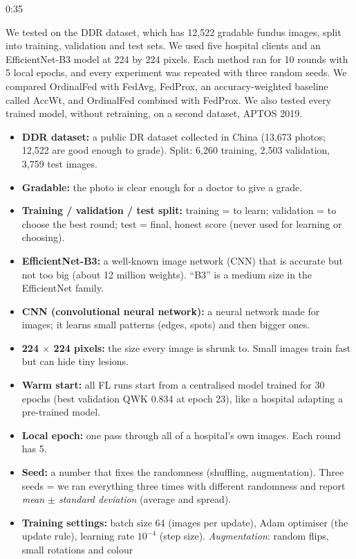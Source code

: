 \documentclass[11pt,a4paper]{article}
\newcommand{\slide}[3]{%
  \par\needspace{7\baselineskip}\bigskip\noindent{\color{accent}\large\bfseries Slide #1 \textperiodcentered\ #2}%
  \hfill{\color{muted}\small #3}\par\smallskip}
\newenvironment{terms}{%
  \par\smallskip\noindent{\color{accent}\small\bfseries TERMS ON THIS SLIDE}\par
  \begin{itemize}[leftmargin=1.2em,itemsep=2pt,topsep=2pt,label={\color{accent}\textbullet}]\small}%
  {\end{itemize}}
\newcommand{\term}[1]{\textbf{#1:}}
\begin{document}
\slide{9}{Experimental setup}{0:35}
We tested on the DDR dataset, which has 12,522 gradable fundus images, split into training,
validation and test sets. We used five hospital clients and an EfficientNet-B3 model at 224 by 224
pixels. Each method ran for 10 rounds with 5 local epochs, and every experiment was repeated with
three random seeds. We compared OrdinalFed with FedAvg, FedProx, an accuracy-weighted baseline
called AccWt, and OrdinalFed combined with FedProx. We also tested every trained model, without
retraining, on a second dataset, APTOS 2019.
\begin{terms}
\item \term{DDR dataset} a public DR dataset collected in China (13,673 photos; 12,522 are good
enough to grade). Split: 6,260 training, 2,503 validation, 3,759 test images.
\item \term{Gradable} the photo is clear enough for a doctor to give a grade.
\item \term{Training / validation / test split} training = to learn; validation = to choose the
best round; test = final, honest score (never used for learning or choosing).
\item \term{EfficientNet-B3} a well-known image network (CNN) that is accurate but not too big
(about 12 million weights). ``B3'' is a medium size in the EfficientNet family.
\item \term{CNN (convolutional neural network)} a neural network made for images; it learns small
patterns (edges, spots) and then bigger ones.
\item \term{224 $\times$ 224 pixels} the size every image is shrunk to. Small images train fast but
can hide tiny lesions.
\item \term{Warm start} all FL runs start from a centralised model trained for 30 epochs (best
validation QWK 0.834 at epoch 23), like a hospital adapting a pre-trained model.
\item \term{Local epoch} one pass through all of a hospital's own images. Each round has 5.
\item \term{Seed} a number that fixes the randomness (shuffling, augmentation). Three seeds = we ran
everything three times with different randomness and report \emph{mean $\pm$ standard deviation}
(average and spread).
\item \term{Training settings} batch size 64 (images per update), Adam optimiser (the update rule),
learning rate $10^{-4}$ (step size). \emph{Augmentation}: random flips, small rotations and colour

\end{terms}
\end{document}
